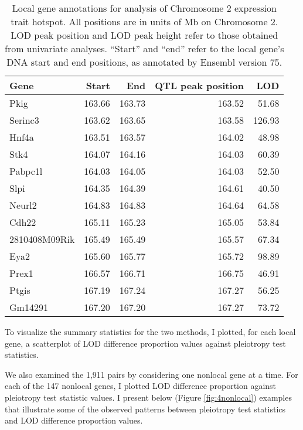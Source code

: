 \documentclass[oneside]{book}\usepackage[]{graphicx}\usepackage[]{color}
\begin{document}
\begin{titlepage}
\begin{table}[ht]
\centering
\begin{tabular}{lrrrr}
  \hline
Gene & Start & End & QTL peak position & LOD\\
  \hline
Pkig & 163.66 & 163.73 & 163.52 & 51.68 \\
  Serinc3 & 163.62 & 163.65 & 163.58 & 126.93 \\
  Hnf4a & 163.51 & 163.57 & 164.02 & 48.98 \\
  Stk4 & 164.07 & 164.16 & 164.03 & 60.39 \\
  Pabpc1l & 164.03 & 164.05 & 164.03 & 52.50 \\
  Slpi & 164.35 & 164.39 & 164.61 & 40.50 \\
  Neurl2 & 164.83 & 164.83 & 164.64 & 64.58 \\
  Cdh22 & 165.11 & 165.23 & 165.05 & 53.84 \\
  2810408M09Rik & 165.49 & 165.49 & 165.57 & 67.34 \\
  Eya2 & 165.60 & 165.77 & 165.72 & 98.89 \\
  Prex1 & 166.57 & 166.71 & 166.75 & 46.91 \\
  Ptgis & 167.19 & 167.24 & 167.27 & 56.25 \\
  Gm14291 & 167.20 & 167.20 & 167.27 & 73.72 \\
   \hline
\end{tabular}
\caption{Local gene annotations for analysis of Chromosome 2 expression trait hotspot.
All positions are in units of Mb on Chromosome 2.
LOD peak position and LOD peak height refer to those obtained from univariate analyses.
``Start'' and ``end'' refer to the local gene's DNA start and end positions, as annotated by Ensembl version 75.}
\label{tab:annot}
\end{table}

To visualize the summary statistics for the two methods, I plotted,
for each local gene, a scatterplot of LOD difference proportion values
against pleiotropy test statistics.





We also examined the 1,911 pairs by considering one nonlocal gene at a time.
For each of the 147 nonlocal genes, I plotted LOD difference proportion
against pleiotropy test statistic values.
I present below (Figure \ref{fig:4nonlocal}) examples that illustrate some of the
observed patterns between pleiotropy test statistics and LOD difference proportion values.



\end{titlepage}
\end{document}
